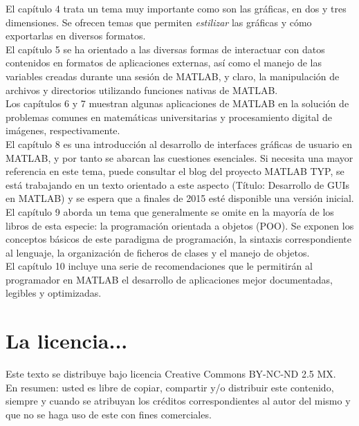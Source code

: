 El capítulo 4 trata un tema muy importante como son las gráficas, en dos y tres dimensiones. Se ofrecen temas
que permiten \textit{estilizar} las gráficas y cómo exportarlas en diversos formatos.\\

El capítulo 5 se ha orientado a las diversas formas de interactuar con datos contenidos en formatos de aplicaciones 
externas, así como el manejo de las variables creadas durante una sesión de MATLAB, y claro, la manipulación de
archivos y directorios utilizando funciones nativas de MATLAB.\\

Los capítulos 6 y 7 muestran algunas aplicaciones de MATLAB en la solución de problemas comunes en matemáticas 
universitarias y procesamiento digital de imágenes, respectivamente.\\

El capítulo 8 es una introducción al desarrollo de interfaces gráficas de usuario en MATLAB, y por tanto se 
abarcan las cuestiones esenciales. Si necesita una mayor referencia en este tema, puede consultar el blog del
proyecto MATLAB TYP, se está trabajando en un texto orientado a este aspecto (Título: Desarrollo de GUIs en MATLAB) 
y se espera que a finales de 2015 esté disponible una versión inicial.\\

El capítulo 9 aborda un tema que generalmente se omite en la mayoría de los libros de esta especie: la programación
orientada a objetos (POO). Se exponen los conceptos básicos de este paradigma de programación, la sintaxis correspondiente 
al lenguaje, la organización de ficheros de clases y el manejo de objetos.\\

El capítulo 10 incluye una serie de recomendaciones que le permitirán al programador en MATLAB el desarrollo de
aplicaciones mejor documentadas, legibles y optimizadas.

\section*{La licencia...}

Este texto se distribuye bajo licencia Creative Commons BY-NC-ND 2.5 MX.\\

En resumen: usted es libre de copiar, compartir y/o distribuir este contenido, siempre y cuando se 
atribuyan los créditos correspondientes al autor del mismo y que no se haga uso de este con fines
comerciales.\\

